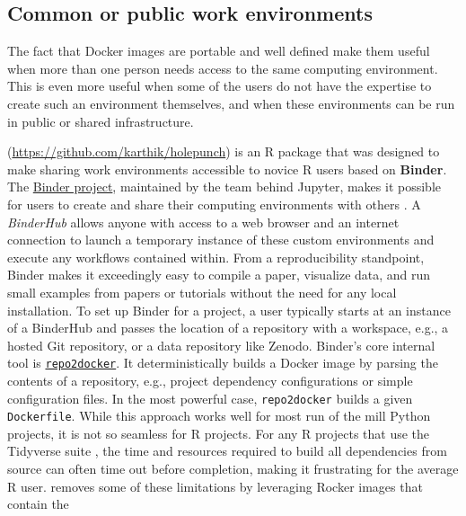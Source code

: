 \hypertarget{common-or-public-work-environments}{%
\subsection{Common or public work
environments}\label{common-or-public-work-environments}}

\label{workenvs}

The fact that Docker images are portable and well defined make them
useful when more than one person needs access to the same computing
environment. This is even more useful when some of the users do not have
the expertise to create such an environment themselves, and when these
environments can be run in public or shared infrastructure.

\textbf{} (\url{https://github.com/karthik/holepunch}) is
an R package that was designed to make sharing work environments
accessible to novice R users based on \textbf{Binder}. The
\href{https://mybinder.readthedocs.io/en/latest/}{Binder project},
maintained by the team behind Jupyter, makes it possible for users to
create and share their computing environments with others
\citep{jupyter_binder_2018}. A \emph{BinderHub} allows anyone with
access to a web browser and an internet connection to launch a temporary
instance of these custom environments and execute any workflows
contained within. From a reproducibility standpoint, Binder makes it
exceedingly easy to compile a paper, visualize data, and run small
examples from papers or tutorials without the need for any local
installation. To set up Binder for a project, a user typically starts at
an instance of a BinderHub and passes the location of a repository with
a workspace, e.g., a hosted Git repository, or a data repository like
Zenodo. Binder's core internal tool is
\href{https://repo2docker.readthedocs.io/en/latest/config_files.html}{\texttt{repo2docker}}.
It deterministically builds a Docker image by parsing the contents of a
repository, e.g., project dependency configurations or simple
configuration files. In the most powerful case, \texttt{repo2docker}
builds a given \texttt{Dockerfile}. While this approach works well for
most run of the mill Python projects, it is not so seamless for R
projects. For any R projects that use the Tidyverse suite
\citep{wickham_welcome_2019}, the time and resources required to build
all dependencies from source can often time out before completion,
making it frustrating for the average R user.  removes
some of these limitations by leveraging Rocker images that contain the
